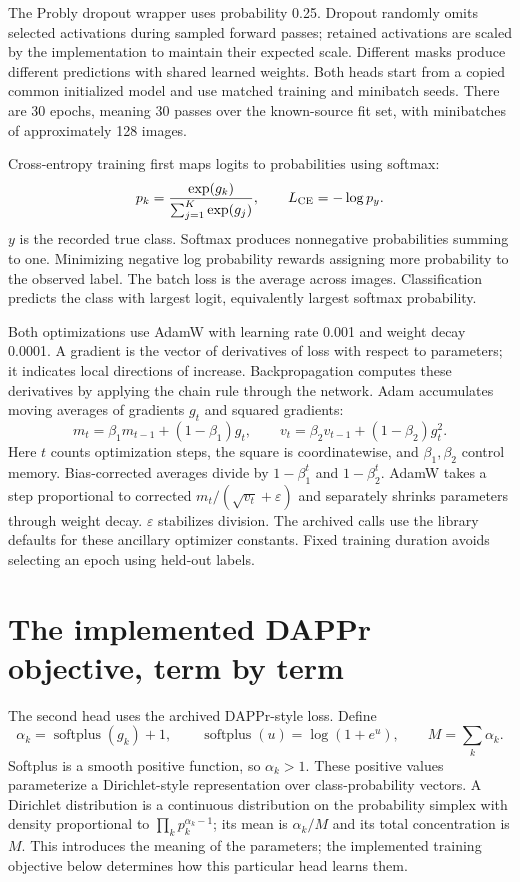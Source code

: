 \documentclass[11pt,a4paper]{report}
\begin{document}
The Probly dropout wrapper uses probability 0.25. Dropout randomly omits selected activations during sampled forward passes; retained activations are scaled by the implementation to maintain their expected scale. Different masks produce different predictions with shared learned weights. Both heads start from a copied common initialized model and use matched training and minibatch seeds. There are 30 epochs, meaning 30 passes over the known-source fit set, with minibatches of approximately 128 images.

Cross-entropy training first maps logits to probabilities using softmax:
\begin{equation}
p_k=\frac{\exp(g_k)}{\sum_{j=1}^K\exp(g_j)},\qquad
L_{\rm CE}=-\log p_y.
\end{equation}
$y$ is the recorded true class. Softmax produces nonnegative probabilities summing to one. Minimizing negative log probability rewards assigning more probability to the observed label. The batch loss is the average across images. Classification predicts the class with largest logit, equivalently largest softmax probability.

Both optimizations use AdamW with learning rate 0.001 and weight decay 0.0001. A gradient is the vector of derivatives of loss with respect to parameters; it indicates local directions of increase. Backpropagation computes these derivatives by applying the chain rule through the network. Adam accumulates moving averages of gradients $g_t$ and squared gradients:
\begin{equation}
m_t=\beta_1m_{t-1}+(1-\beta_1)g_t,\qquad
v_t=\beta_2v_{t-1}+(1-\beta_2)g_t^2.
\end{equation}
Here $t$ counts optimization steps, the square is coordinatewise, and $\beta_1,\beta_2$ control memory. Bias-corrected averages divide by $1-\beta_1^t$ and $1-\beta_2^t$. AdamW takes a step proportional to corrected $m_t/(\sqrt{v_t}+\varepsilon)$ and separately shrinks parameters through weight decay. $\varepsilon$ stabilizes division. The archived calls use the library defaults for these ancillary optimizer constants. Fixed training duration avoids selecting an epoch using held-out labels.

\section{The implemented DAPPr objective, term by term}
The second head uses the archived DAPPr-style loss. Define
\begin{equation}
\alpha_k=\operatorname{softplus}(g_k)+1,\qquad
\operatorname{softplus}(u)=\log(1+e^u),\qquad M=\sum_k\alpha_k.
\end{equation}
Softplus is a smooth positive function, so $\alpha_k>1$. These positive values parameterize a Dirichlet-style representation over class-probability vectors. A Dirichlet distribution is a continuous distribution on the probability simplex with density proportional to $\prod_kp_k^{\alpha_k-1}$; its mean is $\alpha_k/M$ and its total concentration is $M$. This introduces the meaning of the parameters; the implemented training objective below determines how this particular head learns them.
\end{document}
